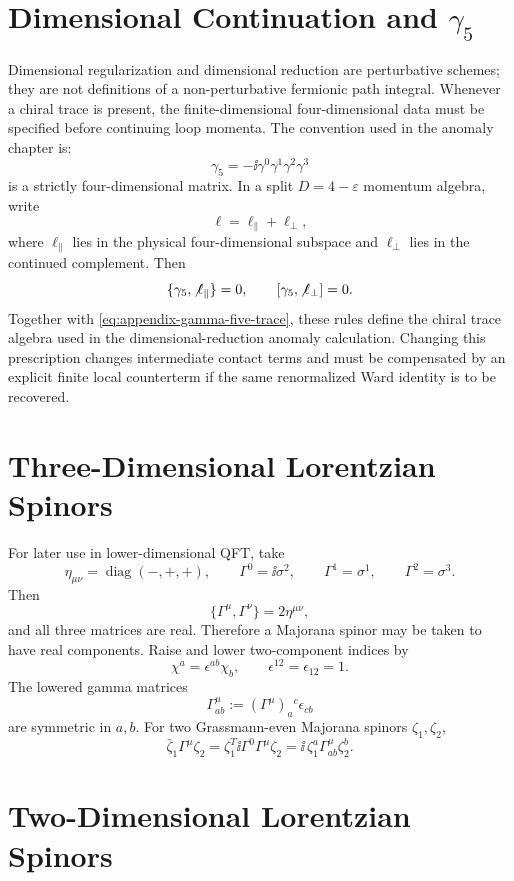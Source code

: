 \section{Dimensional Continuation and \texorpdfstring{\(\gamma_5\)}{gamma5}}

Dimensional regularization and dimensional reduction are perturbative
schemes; they are not definitions of a non-perturbative fermionic path
integral.  Whenever a chiral trace is present, the finite-dimensional
four-dimensional data must be specified before continuing loop momenta.
The convention used in the anomaly chapter is:
\[
  \gamma_5=-\ii\gamma^0\gamma^1\gamma^2\gamma^3
\]
is a strictly four-dimensional matrix.  In a split
\(D=4-\varepsilon\) momentum algebra, write
\[
  \ell=\ell_\parallel+\ell_\perp,
\]
where \(\ell_\parallel\) lies in the physical four-dimensional subspace and
\(\ell_\perp\) lies in the continued complement.  Then
\[
  \{\gamma_5,\not\ell_\parallel\}=0,
  \qquad
  [\gamma_5,\not\ell_\perp]=0 .
\]
Together with \eqref{eq:appendix-gamma-five-trace}, these rules define the
chiral trace algebra used in the dimensional-reduction anomaly calculation.
Changing this prescription changes intermediate contact terms and must be
compensated by an explicit finite local counterterm if the same renormalized
Ward identity is to be recovered.

\section{Three-Dimensional Lorentzian Spinors}

For later use in lower-dimensional QFT, take
\[
  \eta_{\mu\nu}=\operatorname{diag}(-,+,+),
  \qquad
  \Gamma^0=\ii\sigma^2,
  \qquad
  \Gamma^1=\sigma^1,
  \qquad
  \Gamma^2=\sigma^3 .
\]
Then
\[
  \{\Gamma^\mu,\Gamma^\nu\}=2\eta^{\mu\nu},
\]
and all three matrices are real.  Therefore a Majorana spinor may be taken
to have real components.  Raise and lower two-component indices by
\[
  \chi^a=\epsilon^{ab}\chi_b,
  \qquad
  \epsilon^{12}=\epsilon_{12}=1 .
\]
The lowered gamma matrices
\[
  \Gamma^\mu_{ab}:=(\Gamma^\mu)_a{}^c\epsilon_{cb}
\]
are symmetric in \(a,b\).  For two Grassmann-even Majorana spinors
\(\zeta_1,\zeta_2\),
\[
  \bar\zeta_1\Gamma^\mu\zeta_2
  =
  \zeta_1^T\ii\Gamma^0\Gamma^\mu\zeta_2
  =
  \ii\,\zeta_1^a\Gamma^\mu_{ab}\zeta_2^b .
\]

\section{Two-Dimensional Lorentzian Spinors}

